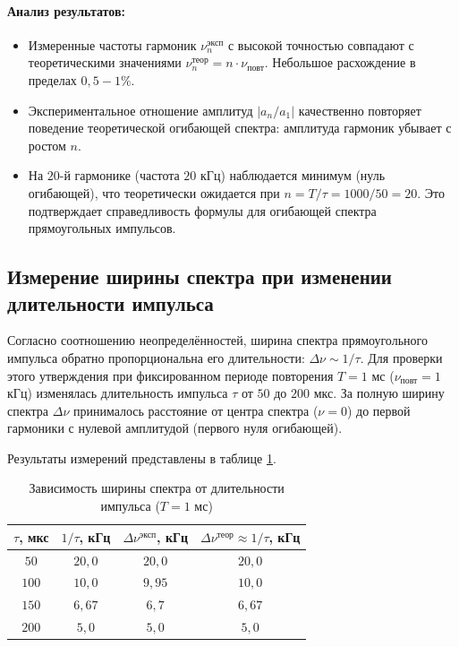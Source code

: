 \documentclass[a4paper,10pt]{article}
\begin{document}
\paragraph{Анализ результатов:}
\begin{itemize}
    \item Измеренные частоты гармоник \(\nu_n^{\text{эксп}}\) с высокой точностью совпадают с теоретическими значениями \(\nu_n^{\text{теор}} = n \cdot \nu_{\text{повт}}\). Небольшое расхождение в пределах \(0,5-1\%\).
    \item Экспериментальное отношение амплитуд \(|a_n/a_1|\) качественно повторяет поведение теоретической огибающей спектра: амплитуда гармоник убывает с ростом \(n\). 
    \item На \(20\)-й гармонике (частота \(20\) кГц) наблюдается минимум (нуль огибающей), что теоретически ожидается при \(n = T/\tau = 1000/50 = 20\). Это подтверждает справедливость формулы для огибающей спектра прямоугольных импульсов.
\end{itemize}

\subsection*{ Измерение ширины спектра при изменении длительности импульса}

Согласно соотношению неопределённостей, ширина спектра прямоугольного импульса обратно пропорциональна его длительности: \(\Delta\nu \sim 1/\tau\). Для проверки этого утверждения при фиксированном периоде повторения \(T = 1\) мс (\(\nu_{\text{повт}} = 1\) кГц) изменялась длительность импульса \(\tau\) от \(50\) до \(200\) мкс. За полную ширину спектра \(\Delta\nu\) принималось расстояние от центра спектра (\(\nu = 0\)) до первой гармоники с нулевой амплитудой (первого нуля огибающей).

Результаты измерений представлены в таблице \ref{tab:width}.

\begin{table}[htbp]
    \centering
    \caption{Зависимость ширины спектра от длительности импульса (\(T = 1\) мс)}
    \label{tab:width}
    \begin{tabular}{|c|c|c|c|}
        \hline
        \(\tau\), мкс & \(1/\tau\), кГц & \(\Delta\nu^{\text{эксп}}\), кГц & \(\Delta\nu^{\text{теор}} \approx 1/\tau\), кГц \\
        \hline
        \(50\)  & \(20,0\) & \(20,0\) & \(20,0\) \\
        \(100\) & \(10,0\) & \(9,95\) & \(10,0\) \\
        \(150\) & \(6,67\) & \(6,7\)  & \(6,67\) \\
        \(200\) & \(5,0\)  & \(5,0\)  & \(5,0\) \\
        \hline
    \end{tabular}
\end{table}
\end{document}
